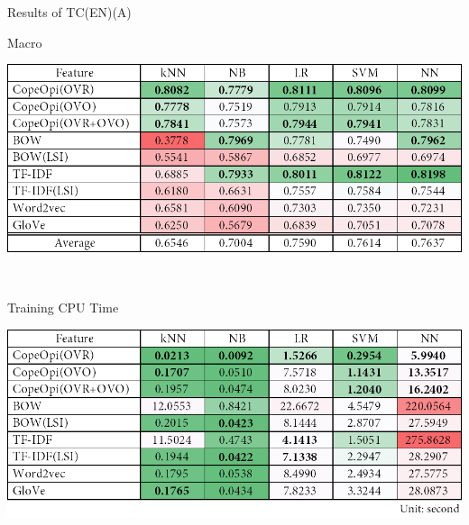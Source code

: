 \begin{table}[H]
\caption{Results of TC(EN)(A)}
\label{tab:tc_en_a}
\centering
\begin{subtable}{\textwidth}
	\centering
	\caption{Macro \fscore{}}
	\includegraphics[width=\resultfigwidth]{chapters/ch4/table/tc/TC(EN)(A).png}
\end{subtable}
\\[\tblskip]
\begin{subtable}{\textwidth}
	\centering
	\caption{Training CPU Time}
	\includegraphics[width=\resultfigwidth]{chapters/ch4/table/tc/TC(EN)(A)T.png}
\end{subtable}
\end{table}